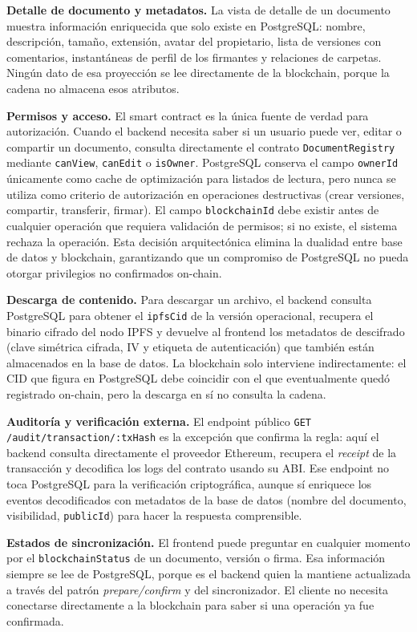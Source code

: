 \documentclass[11pt, a4paper]{article}
\begin{document}
\textbf{Detalle de documento y metadatos.} La vista de detalle de un documento muestra información enriquecida que solo existe en PostgreSQL: nombre, descripción, tamaño, extensión, avatar del propietario, lista de versiones con comentarios, instantáneas de perfil de los firmantes y relaciones de carpetas. Ningún dato de esa proyección se lee directamente de la blockchain, porque la cadena no almacena esos atributos.

\textbf{Permisos y acceso.} El smart contract es la única fuente de verdad para autorización. Cuando el backend necesita saber si un usuario puede ver, editar o compartir un documento, consulta directamente el contrato \texttt{DocumentRegistry} mediante \texttt{canView}, \texttt{canEdit} o \texttt{isOwner}. PostgreSQL conserva el campo \texttt{ownerId} únicamente como cache de optimización para listados de lectura, pero nunca se utiliza como criterio de autorización en operaciones destructivas (crear versiones, compartir, transferir, firmar). El campo \texttt{blockchainId} debe existir antes de cualquier operación que requiera validación de permisos; si no existe, el sistema rechaza la operación. Esta decisión arquitectónica elimina la dualidad entre base de datos y blockchain, garantizando que un compromiso de PostgreSQL no pueda otorgar privilegios no confirmados on-chain.

\textbf{Descarga de contenido.} Para descargar un archivo, el backend consulta PostgreSQL para obtener el \texttt{ipfsCid} de la versión operacional, recupera el binario cifrado del nodo IPFS y devuelve al frontend los metadatos de descifrado (clave simétrica cifrada, IV y etiqueta de autenticación) que también están almacenados en la base de datos. La blockchain solo interviene indirectamente: el CID que figura en PostgreSQL debe coincidir con el que eventualmente quedó registrado on-chain, pero la descarga en sí no consulta la cadena.

\textbf{Auditoría y verificación externa.} El endpoint público \texttt{GET /audit/transaction/:txHash} es la excepción que confirma la regla: aquí el backend consulta directamente el proveedor Ethereum, recupera el \textit{receipt} de la transacción y decodifica los logs del contrato usando su ABI. Ese endpoint no toca PostgreSQL para la verificación criptográfica, aunque sí enriquece los eventos decodificados con metadatos de la base de datos (nombre del documento, visibilidad, \texttt{publicId}) para hacer la respuesta comprensible.

\textbf{Estados de sincronización.} El frontend puede preguntar en cualquier momento por el \texttt{blockchainStatus} de un documento, versión o firma. Esa información siempre se lee de PostgreSQL, porque es el backend quien la mantiene actualizada a través del patrón \textit{prepare/confirm} y del sincronizador. El cliente no necesita conectarse directamente a la blockchain para saber si una operación ya fue confirmada.
\end{document}
